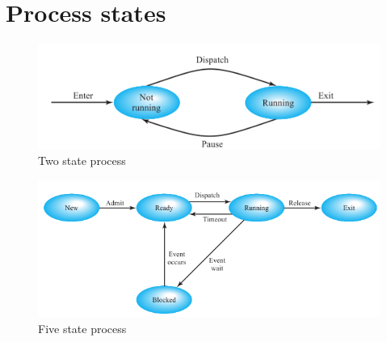 \section{Process states}

\begin{figure}
\centering
\includegraphics{img/twostate.PNG}
\caption{Two state process}
\label{fig:simpblock}
\end{figure}

\begin{figure}
\centering
\includegraphics{img/fivestate.PNG}
\caption{Five state process}
\label{fig:simpblock}
\end{figure}

